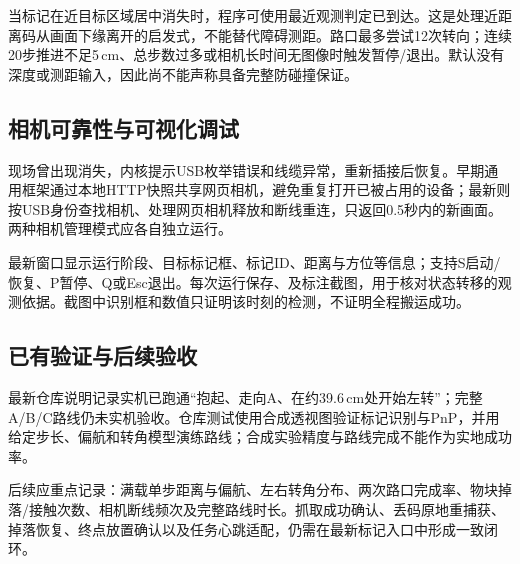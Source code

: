 当标记在近目标区域居中消失时，程序可使用最近观测判定已到达。这是处理近距离码从画面下缘离开的启发式，不能替代障碍测距。路口最多尝试12次转向；连续20步推进不足5\,cm、总步数过多或相机长时间无图像时触发暂停/退出。默认没有深度或测距输入，因此尚不能声称具备完整防碰撞保证。

\subsection{相机可靠性与可视化调试}
现场曾出现消失，内核提示USB枚举错误和线缆异常，重新插接后恢复。早期通用框架通过本地HTTP快照共享网页相机，避免重复打开已被占用的设备；最新则按USB身份查找相机、处理网页相机释放和断线重连，只返回0.5秒内的新画面。两种相机管理模式应各自独立运行。

最新窗口显示运行阶段、目标标记框、标记ID、距离与方位等信息；支持S启动/恢复、P暂停、Q或Esc退出。每次运行保存、及标注截图，用于核对状态转移的观测依据。截图中识别框和数值只证明该时刻的检测，不证明全程搬运成功。

\subsection{已有验证与后续验收}
最新仓库说明记录实机已跑通“抱起、走向A、在约39.6\,cm处开始左转”；完整A/B/C路线仍未实机验收\cite{maze}。仓库测试使用合成透视图验证标记识别与PnP，并用给定步长、偏航和转角模型演练路线；合成实验精度与路线完成不能作为实地成功率。

后续应重点记录：满载单步距离与偏航、左右转角分布、两次路口完成率、物块掉落/接触次数、相机断线频次及完整路线时长。抓取成功确认、丢码原地重捕获、掉落恢复、终点放置确认以及任务心跳适配，仍需在最新标记入口中形成一致闭环。
